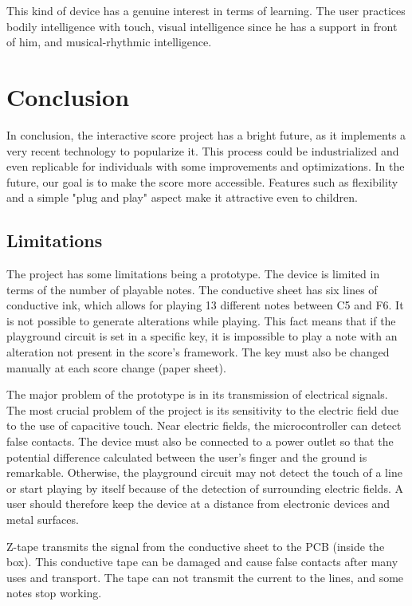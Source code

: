 This kind of device has a genuine interest in terms of learning. The user practices bodily intelligence with touch, visual intelligence since he has a support in front of him, and musical-rhythmic intelligence.

\section{Conclusion}

In conclusion, the interactive score project has a bright future, as it implements a very recent technology to popularize it. This process could be industrialized and even replicable for individuals with some improvements and optimizations. In the future, our goal is to make the score more accessible. Features such as flexibility and a simple "plug and play" aspect make it attractive even to children.

\subsection{Limitations}

The project has some limitations being a prototype. The device is limited in terms of the number of playable notes. The conductive sheet has six lines of conductive ink, which allows for playing 13 different notes between C5 and F6. It is not possible to generate alterations while playing. This fact means that if the playground circuit is set in a specific key, it is impossible to play a note with an alteration not present in the score's framework. The key must also be changed manually at each score change (paper sheet).

The major problem of the prototype is in its transmission of electrical signals.
The most crucial problem of the project is its sensitivity to the electric field due to the use of capacitive touch. Near electric fields, the microcontroller can detect false contacts. The device must also be connected to a power outlet so that the potential difference calculated between the user's finger and the ground is remarkable. Otherwise, the playground circuit may not detect the touch of a line or start playing by itself because of the detection of surrounding electric fields. A user should therefore keep the device at a distance from electronic devices and metal surfaces.

Z-tape transmits the signal from the conductive sheet to the PCB (inside the box). This conductive tape can be damaged and cause false contacts after many uses and transport. The tape can not transmit the current to the lines, and some notes stop working.

